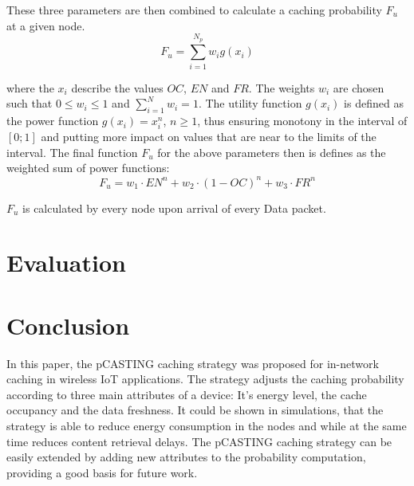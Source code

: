 \documentclass[conference]{IEEEtran}
\begin{document}
These three parameters are then combined to calculate a caching probability $F_u$ at a given node.
\begin{equation}
	F_u = \sum_{i = 1}^{N_p} w_i g(x_i)
\end{equation}

where the $x_i$ describe the values $OC$, $EN$ and $FR$. The weights $w_i$ are chosen such that $0 \leq w_i \leq 1$ and $\sum_{i = 1}^{N} w_i = 1$. The utility function $g(x_i)$ is defined as the power function $g(x_i) = x_i^n$, $n \geq 1$, thus ensuring monotony in the interval of $[0; 1]$ and putting more impact on values that are near to the limits of the interval. The final function $F_u$ for the above parameters then is defines as the weighted sum of power functions:
\begin{equation}
	F_u = w_1 \cdot EN^n + w_2 \cdot (1 - OC)^n + w_3 \cdot FR^n
\end{equation}

$F_u$ is calculated by every node upon arrival of every Data packet.

\section{Evaluation}
\label{sec:eval}

\section{Conclusion}
\label{sec:conclusion}

In this paper, the {pCASTING} caching strategy was proposed for in-network caching in wireless IoT applications. The strategy adjusts the caching probability according to three main attributes of a device: It's energy level, the cache occupancy and the data freshness. It could be shown in simulations, that the strategy is able to reduce energy consumption in the nodes and while at the same time reduces content retrieval delays. The {pCASTING} caching strategy can be easily extended by adding new attributes to the probability computation, providing a good basis for future work.

\printbibliography
\end{document}
